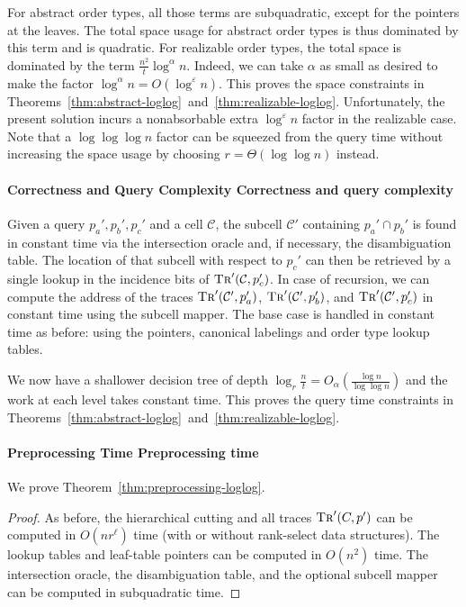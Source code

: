 For abstract order types, all those terms are subquadratic, except for the
pointers at the leaves. The total space
usage for abstract order types is thus dominated by this term and
is quadratic.
%
For realizable order types, the total space is dominated by the term
\(\frac{n^2}{t} \log^{\alpha} n\).
Indeed, we can take \(\alpha\) as small as desired
to make the factor \(\log^{\alpha} n = O(\log^{\varepsilon} n)\).
%
This proves the space constraints in
Theorems~\ref{thm:abstract-loglog}~and~\ref{thm:realizable-loglog}.
%
Unfortunately, the present solution incurs a nonabsorbable
extra \(\log^{\varepsilon} n\) factor in the realizable case. Note that a
\(\log{\log{\log{n}}}\) factor can be squeezed from the query time without
increasing the space usage by choosing \(r = \Theta(\log \log n)\) instead.


\paragraph*{\iftitlecase%
Correctness and Query Complexity\else%
Correctness and query complexity\fi}
Given a query \(p_a', p_b', p_c'\) and a cell \(\mathcal{C}\),
the subcell \(\mathcal{C}'\) containing \(p_a' \cap p_b'\) is found in constant
time via the
intersection oracle and, if necessary, the disambiguation table.
The location of that subcell with respect to \(p_c'\) can then be retrieved by
a single lookup in the incidence bits of \(\textsc{Tr}'(\mathcal{C}, p_c')\).
In case of recursion, we can compute the address of the traces
\(\textsc{Tr}'(\mathcal{C}', p_a')\),
\(\textsc{Tr}'(\mathcal{C}', p_b')\), and
\(\textsc{Tr}'(\mathcal{C}', p_c')\) in constant time using the subcell mapper.
The base case is handled in constant time as before: using the pointers,
canonical labelings and order type lookup tables.

We now have a shallower decision tree of depth
\(\log_r{\frac{n}{t}} = O_\alpha(\frac{\log{n}}{\log{\log{n}}})\)
and the work at each level takes constant time.
This proves the query time constraints in
Theorems~\ref{thm:abstract-loglog}~and~\ref{thm:realizable-loglog}.

\paragraph*{\iftitlecase%
Preprocessing Time\else%
Preprocessing time\fi}
We prove Theorem~\ref{thm:preprocessing-loglog}.
\begin{proof}
  As before, the hierarchical cutting and all traces \(\textsc{Tr}'(C, p')\)
  can be computed in \(O(nr^\ell)\) time (with or without rank-select data
  structures). The lookup tables and leaf-table pointers can be computed in
  \(O(n^2)\) time. The intersection oracle, the disambiguation table, and the
  optional subcell mapper can be computed in subquadratic time.
\end{proof}
